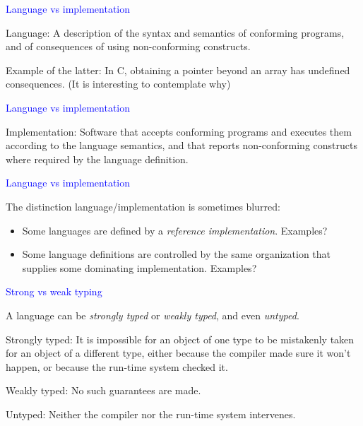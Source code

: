 \documentclass{slides}
\newcommand{\ti}[1]{\begin{center}\Large{\textcolor{blue}{#1}}\end{center}}
\begin{document}
\begin{slide}\ti{Language vs implementation}

Language: A description of the syntax and semantics of conforming
programs, and of consequences of using non-conforming constructs.

Example of the latter: In C, obtaining a pointer beyond an array has
undefined consequences.  (It is interesting to contemplate why)

\vfill\end{slide}
\begin{slide}\ti{Language vs implementation}

Implementation: Software that accepts conforming programs and executes
them according to the language semantics, and that reports
non-conforming constructs where required by the language definition.

\vfill\end{slide}
\begin{slide}\ti{Language vs implementation}

The distinction language/implementation is sometimes blurred:

\begin{itemize}
\item Some languages are defined by a \emph{reference
  implementation}.  Examples?
\item Some language definitions are controlled by the same
  organization that supplies some dominating implementation.
  Examples?
\end{itemize}

\vfill\end{slide}
\begin{slide}\ti{Strong vs weak typing}

A language can be \emph{strongly typed} or \emph{weakly typed}, and
even \emph{untyped}.

Strongly typed: It is impossible for an object of one type to be
mistakenly taken for an object of a different type, either because the
compiler made sure it won't happen, or because the run-time system
checked it.

Weakly typed: No such guarantees are made.

Untyped: Neither the compiler nor the run-time system intervenes.

\vfill\end{slide}
\end{document}
